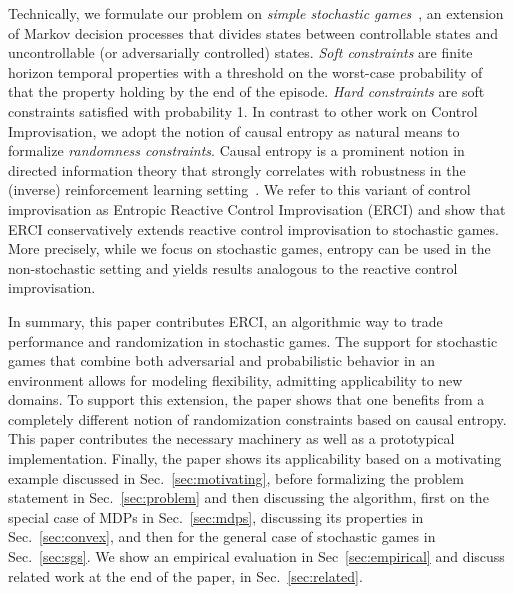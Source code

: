 Technically, we formulate our problem on \emph{simple stochastic
games}~\cite{DBLP:conf/dimacs/Condon90}, an extension of Markov decision processes that divides states
between controllable states and uncontrollable (or adversarially
controlled) states. \emph{Soft constraints} are finite horizon
temporal properties with a threshold on the worst-case probability of
that the property holding by the end of the episode. \emph{Hard
constraints} are soft constraints satisfied with probability 1. In
contrast to other work on Control Improvisation, we adopt the notion
of causal entropy as natural means to formalize \emph{randomness
constraints}.  Causal entropy is a prominent notion in directed
information theory that strongly correlates with robustness in the
(inverse) reinforcement learning setting~\cite{mceThesis,
maxEntAnswer}. We refer to this variant of control improvisation as
Entropic Reactive Control Improvisation (ERCI) and show that ERCI
conservatively extends reactive control improvisation to stochastic
games. More precisely, while we focus on stochastic games, entropy can
be used in the non-stochastic setting and yields results analogous to
the reactive control improvisation.


%
In summary, this paper contributes ERCI, an algorithmic way to trade
performance and randomization in stochastic games. The support for
stochastic games that combine both adversarial and probabilistic
behavior in an environment allows for modeling flexibility,
admitting applicability to new domains. To support this extension,
the paper shows that one benefits from a completely different notion
of randomization constraints based on causal entropy.  This paper
contributes the necessary machinery as well as a prototypical
implementation. Finally, the paper shows its applicability based on a
motivating example discussed in Sec.~\ref{sec:motivating}, before
formalizing the problem statement in Sec.~\ref{sec:problem} and then
discussing the algorithm, first on the special case of MDPs in
Sec.~\ref{sec:mdps}, discussing its properties in Sec.~\ref{sec:convex}, and then for the general case of stochastic games
in Sec.~\ref{sec:sgs}.  We show an empirical evaluation in
Sec~\ref{sec:empirical} and discuss related work at the end of the
paper, in Sec.~\ref{sec:related}.



